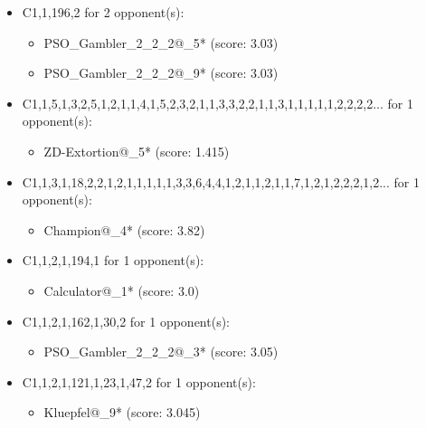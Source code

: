 \begin{appendices}
\begin{itemize}
    \item C1,1,196,2 for 2 opponent(s):
    \begin{multicols}{3}
         \begin{itemize}
            \item PSO\_Gambler\_2\_2\_2@\_5* (score: 3.03)
            \item PSO\_Gambler\_2\_2\_2@\_9* (score: 3.03)
        \end{itemize}
     \end{multicols}
     
    \item C1,1,5,1,3,2,5,1,2,1,1,4,1,5,2,3,2,1,1,3,3,2,2,1,1,3,1,1,1,1,1,2,2,2,2... for 1 opponent(s):
    \begin{multicols}{3}
         \begin{itemize}
            \item ZD-Extortion@\_5* (score: 1.415)
        \end{itemize}
     \end{multicols}
     
    \item C1,1,3,1,18,2,2,1,2,1,1,1,1,1,3,3,6,4,4,1,2,1,1,2,1,1,7,1,2,1,2,2,2,1,2... for 1 opponent(s):
    \begin{multicols}{3}
         \begin{itemize}
            \item Champion@\_4* (score: 3.82)
        \end{itemize}
     \end{multicols}
     
    \item C1,1,2,1,194,1 for 1 opponent(s):
    \begin{multicols}{3}
         \begin{itemize}
            \item Calculator@\_1* (score: 3.0)
        \end{itemize}
     \end{multicols}
     
    \item C1,1,2,1,162,1,30,2 for 1 opponent(s):
    \begin{multicols}{3}
         \begin{itemize}
            \item PSO\_Gambler\_2\_2\_2@\_3* (score: 3.05)
        \end{itemize}
     \end{multicols}
     
    \item C1,1,2,1,121,1,23,1,47,2 for 1 opponent(s):
    \begin{multicols}{3}
         \begin{itemize}
            \item Kluepfel@\_9* (score: 3.045)
        \end{itemize}
     \end{multicols}
     

\end{itemize}
\end{appendices}
